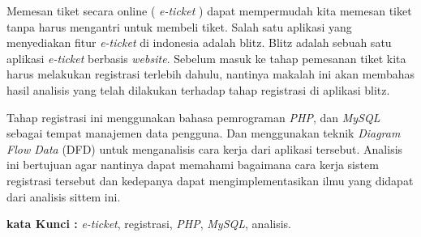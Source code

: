 \begin{originality}
\par
	Memesan tiket secara online ( \textit{e-ticket} ) dapat mempermudah kita memesan tiket tanpa harus mengantri untuk membeli tiket. Salah satu aplikasi yang menyediakan fitur \textit{e-ticket} di indonesia adalah blitz. Blitz adalah sebuah satu aplikasi \textit{e-ticket} berbasis \textit{website}. Sebelum masuk ke tahap pemesanan tiket kita harus melakukan registrasi terlebih dahulu, nantinya makalah ini akan membahas hasil analisis yang telah dilakukan terhadap tahap registrasi di aplikasi blitz.
\par
	Tahap registrasi ini menggunakan bahasa pemrograman \textit{PHP}, dan \textit{MySQL} sebagai tempat manajemen data pengguna. Dan menggunakan teknik \textit{Diagram Flow Data} (DFD) untuk menganalisis cara kerja dari aplikasi tersebut. Analisis ini bertujuan agar nantinya dapat memahami bagaimana cara kerja sistem registrasi tersebut dan kedepanya dapat mengimplementasikan ilmu yang didapat dari analisis sittem ini.
	
	

\textbf{kata Kunci :} \textit{e-ticket}, registrasi, \textit{PHP}, \textit{MySQL}, analisis.

\end{originality}